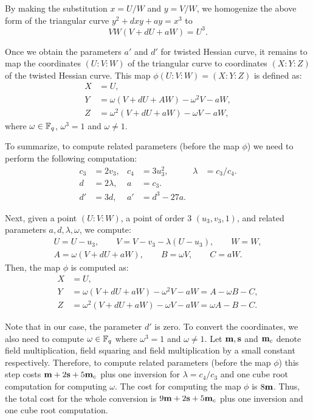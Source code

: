 By making the substitution $x = U/W$ and $y = V/W$,
we homogenize the above form of the triangular curve $y^2 + dxy + ay = x^3$ to
$$ VW(V + dU + aW) = U^3. $$

Once we obtain the parameters $a'$ and $d'$ for twisted Hessian curve,
it remains to map the coordinates $(U : V : W)$ of the triangular curve
to coordinates $(X : Y : Z)$ of the twisted Hessian curve.
This map $\phi(U:V:W) = (X:Y:Z)$ is defined as:
\begin{align*}
X &= U, \\
Y &= \omega(V + dU + AW) - \omega^2 V - aW, \\
Z &= \omega^2 (V + dU + aW) - \omega V - aW,
\end{align*}
where $\omega \in \mathbb{F}_{q}$, $\omega^3 = 1$ and $\omega \ne 1$.

To summarize, to compute related parameters (before the map $\phi$)
we need to perform the following computation:
\begin{align*}
c_3 &= 2 v_3,	&	c_4 &= 3 u_3^2,		&	\lambda &= c_3 / c_4.	\\
d &= 2 \lambda,	&	a &= c_3.		&	\\
d' &= 3 d,	&	a' &= d^3 - 27 a.	&
\end{align*}

Next,
given a point $(U:V:W)$, a point of order 3 $(u_3,v_3,1)$, and related parameters
$a,d,\lambda,\omega$,
we compute:
\begin{gather*}
U = U - u_3, \qquad
V = V - v_3 - \lambda (U - u_3), \qquad
W = W, \\
A = \omega(V + dU + aW),	\qquad
B = \omega V,	\qquad
C = aW.
\end{gather*}
Then, the map $\phi$ is computed as:
\begin{align*}
X &= U,	\\
Y &= \omega(V + dU + aW) - \omega^2V - aW = A - \omega B - C,	\\
Z &= \omega^2(V + dU + aW) - \omega V - aW = \omega A - B - C.
\end{align*}

Note that in our case, the parameter $d'$ is zero.
To convert the coordinates, we also need to compute $\omega \in \mathbb{F}_{q}$
where $\omega^3 = 1$ and $\omega \ne 1$.
Let $\textbf{m}, \textbf{s}$ and $\textbf{m}_{c}$ denote
field multiplication, field squaring and field multiplication by a small constant respectively.
Therefore, to compute related parameters (before the map $\phi$)
this step costs $\textbf{m} + 2\textbf{s} + 5\textbf{m}_{c}$
plus one inversion for $\lambda = c_4 / c_3$
and one cube root computation for computing $\omega$.
The cost for computing the map $\phi$ is $8\textbf{m}$.
Thus, the total cost for the whole conversion is $9\textbf{m} + 2\textbf{s} + 5\textbf{m}_{c}$
plus one inversion and one cube root computation.


